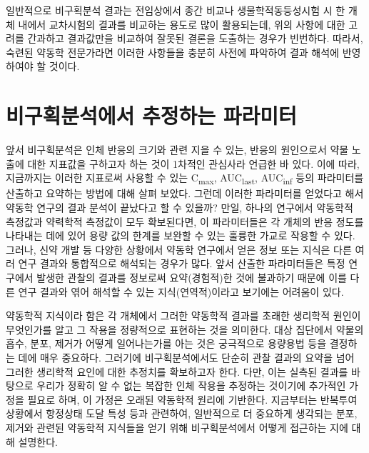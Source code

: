 \documentclass[
  11pt,
  krantz2, a4paper, twoside]{krantz}
\theoremstyle{definition}
\theoremstyle{definition}
\theoremstyle{definition}
\theoremstyle{definition}
\theoremstyle{remark}
\begin{document}
일반적으로 비구획분석 결과는 전임상에서 종간 비교나 생물학적동등성시험 시 한 개체 내에서 교차시험의 결과를 비교하는 용도로 많이 활용되는데, 위의 사항에 대한 고려를 간과하고 결과값만을 비교하여 잘못된 결론을 도출하는 경우가 빈번하다. 따라서, 숙련된 약동학 전문가라면 이러한 사항들을 충분히 사전에 파악하여 결과 해석에 반영하여야 할 것이다.

\hypertarget{uxbe44uxad6cuxd68duxbd84uxc11duxc5d0uxc11c-uxcd94uxc815uxd558uxb294-uxd30cuxb77cuxbbf8uxd130}{%
\section{비구획분석에서 추정하는 파라미터}\label{uxbe44uxad6cuxd68duxbd84uxc11duxc5d0uxc11c-uxcd94uxc815uxd558uxb294-uxd30cuxb77cuxbbf8uxd130}}

앞서 비구획분석은 인체 반응의 크기와 관련 지을 수 있는, 반응의 원인으로서 약물 노출에 대한 지표값을 구하고자 하는 것이 1차적인 관심사라 언급한 바 있다.
이에 따라, 지금까지는 이러한 지표로써 사용할 수 있는 C\textsubscript{max}, AUC\textsubscript{last}, AUC\textsubscript{inf} 등의 파라미터를 산출하고 요약하는 방법에 대해 살펴 보았다.
그런데 이러한 파라미터를 얻었다고 해서 약동학 연구의 결과 분석이 끝났다고 할 수 있을까?
만일, 하나의 연구에서 약동학적 측정값과 약력학적 측정값이 모두 확보된다면, 이 파라미터들은 각 개체의 반응 정도를 나타내는 데에 있어 용량 값의 한계를 보완할 수 있는 훌륭한 가교로 작용할 수 있다.
그러나, 신약 개발 등 다양한 상황에서 약동학 연구에서 얻은 정보 또는 지식은 다른 여러 연구 결과와 통합적으로 해석되는 경우가 많다.
앞서 산출한 파라미터들은 특정 연구에서 발생한 관찰의 결과를 정보로써 요약(경험적)한 것에 불과하기 때문에 이를 다른 연구 결과와 엮어 해석할 수 있는 지식(연역적)이라고 보기에는 어려움이 있다.

약동학적 지식이라 함은 각 개체에서 그러한 약동학적 결과를 초래한 생리학적 원인이 무엇인가를 알고 그 작용을 정량적으로 표현하는 것을 의미한다. 대상 집단에서 약물의 흡수, 분포, 제거가 어떻게 일어나는가를 아는 것은 궁극적으로 용량용법 등을 결정하는 데에 매우 중요하다. 그러기에 비구획분석에서도 단순히 관찰 결과의 요약을 넘어 그러한 생리학적 요인에 대한 추정치를 확보하고자 한다. 다만, 이는 실측된 결과를 바탕으로 우리가 정확히 알 수 없는 복잡한 인체 작용을 추정하는 것이기에 추가적인 가정을 필요로 하며, 이 가정은 오래된 약동학적 원리에 기반한다. 지금부터는 반복투여 상황에서 항정상태 도달 특성 등과 관련하여, 일반적으로 더 중요하게 생각되는 분포, 제거와 관련된 약동학적 지식들을 얻기 위해 비구획분석에서 어떻게 접근하는 지에 대해 설명한다.
\end{document}
